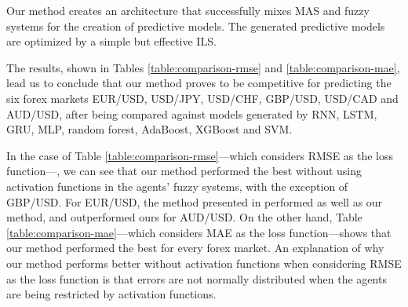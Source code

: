 \documentclass{ieeeaccess}
\begin{document}
Our method creates an architecture that successfully mixes MAS and
fuzzy systems for the creation of predictive models. The generated
predictive models are optimized by a simple but effective
ILS.

The results, shown in Tables \ref{table:comparison-rmse} and
\ref{table:comparison-mae}, lead us to conclude that our method proves to
be competitive for predicting the six forex markets EUR/USD, USD/JPY,
USD/CHF, GBP/USD, USD/CAD and AUD/USD, after being compared against
models generated by RNN, LSTM, GRU, MLP, random forest, AdaBoost,
XGBoost and SVM. %

In the case of Table \ref{table:comparison-rmse}---which
considers RMSE as the loss function---, we can see that our method
performed the best without using activation functions in the agents'
fuzzy systems, with the exception of GBP/USD. %
For EUR/USD, the method
presented in \cite{Munkhdalai2019} performed as well as our method,
and outperformed ours for AUD/USD. On the other hand,
Table
\ref{table:comparison-mae}---which considers MAE as the loss
function---shows that our method performed the best for every forex
market. An explanation of why our method performs better without
activation functions when considering RMSE as the loss function is
that errors are not normally distributed when the agents are being
restricted by activation functions.
\end{document}
